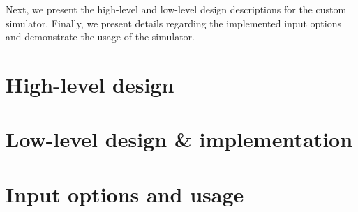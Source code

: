 Next, we present the high-level and low-level design descriptions 
for the custom simulator. Finally, we present details regarding the
implemented input options and demonstrate the usage of the simulator.

\section{High-level design}
\label{sec:simreplaychap-design}


\section{Low-level design \& implementation}
\label{sec:simreplaychap-implementation}


\section{Input options and usage}
\label{sec:simreplaychap-usage}

